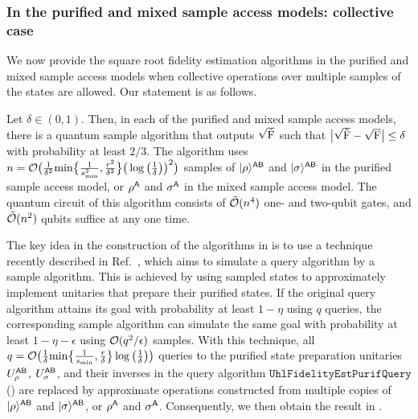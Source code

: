 










\subsubsection{In the purified and mixed sample access models: collective case}
\label{sec:fidelity estimation collective}



We now provide the square root fidelity estimation algorithms in the purified and mixed sample access models when collective operations over multiple samples of the states are allowed.
Our statement is as follows.



\begin{theorem}
\label{thm:fidelity est local sample collective}
Let $\delta \in (0, 1)$. Then, in each of the purified and mixed sample access models, there is a quantum sample algorithm that outputs $\sqrt{\tilde{{\mathrm{F}}}}$ such that $\big|\sqrt{\tilde{{\mathrm{F}}}} - \sqrt{{\mathrm{F}}}\big| \leq \delta$ with probability at least $2/3$. The algorithm uses $n = {\mathcal{O}}\big(\frac{1}{\delta^2}{\rm min}\big\{\frac{1}{s_{\rm min}^2}, \frac{r^2}{\delta^2}\big\}\big(\log{\big(\frac{1}{\delta}\big)}\big)^2\big)$ samples of $|\rho\rangle^{{\mathsf{A}}{\mathsf{B}}}$ and $|\sigma\rangle^{{\mathsf{A}}{\mathsf{B}}}$ in the purified sample access model, or $\rho^{\mathsf{A}}$ and $\sigma^{\mathsf{A}}$ in the mixed sample access model.
The quantum circuit of this algorithm consists of $\tilde{{\mathcal{O}}}(n^4)$ one- and two-qubit gates, and $\tilde{{\mathcal{O}}}(n^2)$ qubits suffice at any one time.

\end{theorem}





The key idea in the construction of the algorithms in  is to use a technique recently described in Ref.~\cite{tang2025conjugatequerieshelp}, which aims to simulate a query algorithm by a sample algorithm. This is achieved by using sampled states to approximately implement unitaries that prepare their purified states.
If the original query algorithm attains its goal with probability at least $1-\eta$ using $q$ queries, the corresponding sample algorithm can simulate the same goal with probability at least $1-\eta-\epsilon$ using ${\mathcal{O}}(q^2/\epsilon)$ samples.
With this technique, all $q = {\mathcal{O}}\big(\frac{1}{\delta}{\rm min}\big\{\frac{1}{s_{\rm min}}, \frac{r}{\delta}\big\}\log{\big(\frac{1}{\delta}\big)}\big)$ queries to the purified state preparation unitaries $U_\rho^{{\mathsf{A}}{\mathsf{B}}}$, $U_\sigma^{{\mathsf{A}}{\mathsf{B}}}$, and their inverses in the query algorithm $\mathtt{UhlFidelityEstPurifQuery}$ () are replaced by approximate operations constructed from multiple copies of $|\rho\rangle^{{\mathsf{A}}{\mathsf{B}}}$ and $|\sigma\rangle^{{\mathsf{A}}{\mathsf{B}}}$, or $\rho^{\mathsf{A}}$ and $\sigma^{\mathsf{A}}$. Consequently, we then obtain the result in .


